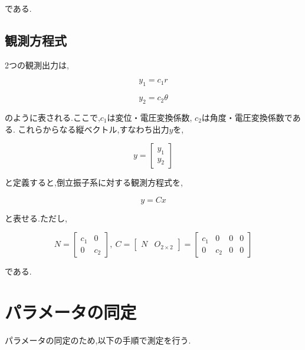 である.

\subsection{観測方程式}
2つの観測出力は,

$$
    y_{1} = c_{1} r
$$

$$
    y_{2} = c_{2} \theta
$$

のように表される.ここで,$c_{1}$は変位・電圧変換係数, $c_{2}$は角度・電圧変換係数である.
これらからなる縦ベクトル,すなわち出力$y$を,

$$
    y = 
    \left[
        \begin{array}{c}
            y_{1} \\
            y_{2}
        \end{array}    
    \right]
$$

と定義すると,倒立振子系に対する観測方程式を,

\begin{equation}
    y = Cx
\end{equation}

と表せる.ただし,

$$
    N = 
    \left[
        \begin{array}{cc}
            c_{1}  &  0 \\
            0      &  c_{2}
        \end{array}
    \right],\
    C = 
    \left[
        \begin{array}{cc}
            N  &  O_{2 \times 2}
        \end{array}
    \right]
    =
    \left[
        \begin{array}{cccc}
            c_{1}  &    0    &    0    &    0 \\
            0      &  c_{2}  &    0    &    0
        \end{array}
    \right]
$$

である.

\section{パラメータの同定}
パラメータの同定のため,以下の手順で測定を行う.

